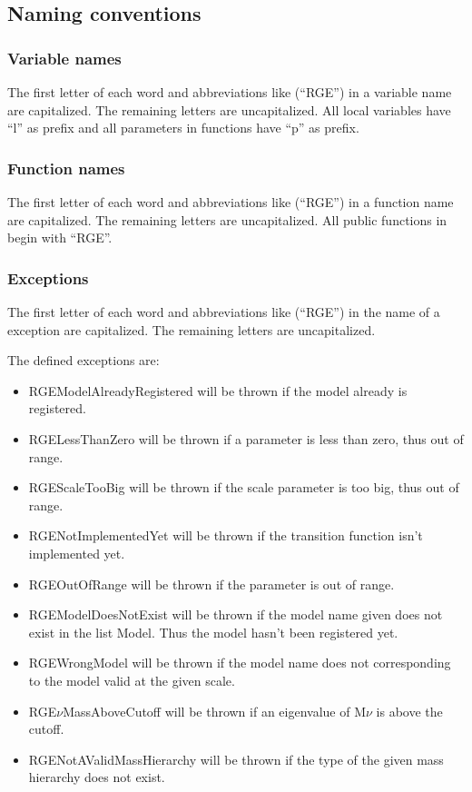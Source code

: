 \subsection{Naming conventions}

\subsubsection{Variable names}
The first letter of each word and abbreviations like (``RGE'') in a variable
name are capitalized. The remaining letters are uncapitalized.  All local
variables have ``l'' as prefix and all parameters in functions have ``p'' as
prefix.

\subsubsection{Function names}
The first letter of each word and abbreviations like (``RGE'') in a function
name are capitalized. The remaining letters are uncapitalized.  All public
functions in  begin with ``RGE''.

\subsubsection{Exceptions}
The first letter of each word and abbreviations like (``RGE'') in the name of a
exception are capitalized. The remaining letters are uncapitalized.

The defined exceptions are:\\
\begin{itemize}
\item RGEModelAlreadyRegistered will be thrown if the model already is
registered.
\item RGELessThanZero will be thrown if a parameter is less than zero, thus out
of range.
\item RGEScaleTooBig will be thrown if the scale parameter is too big, thus out
of range.
\item RGENotImplementedYet will be thrown if the transition function isn't
implemented yet.
\item RGEOutOfRange will be thrown if the parameter is out of range.
\item RGEModelDoesNotExist will be thrown if the model name given does not exist
in the list Model. Thus the model hasn't been registered yet.
\item RGEWrongModel will be thrown if the model name does not corresponding to
the model valid at the given scale.
\item RGE$\nu$MassAboveCutoff will be thrown if an eigenvalue of M$\nu$ is above
the cutoff.
\item RGENotAValidMassHierarchy will be thrown if the type of the given mass
hierarchy does not exist.
\end{itemize}
